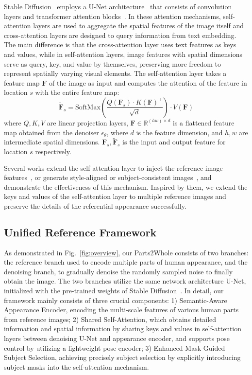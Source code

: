Stable Diffusion~\cite{rombach2022ldm} employs a U-Net architecture~\cite{ronneberger2015unet} that consists of convolution layers and transformer attention blocks~\cite{vaswani2017attention}. In these attention mechanisms, self-attention layers are used to aggregate the spatial features of the image itself and cross-attention layers are designed to query information from text embedding. The main difference is that the cross-attention layer uses text features as keys and values, while in self-attention layers, image features with spatial dimensions serve as query, key, and value by themselves, preserving more freedom to represent spatially varying visual elements. The self-attention layer takes a feature map $\bm{F}$ of the image as input and computes the attention of the feature in location $s$ with the entire feature map: 
\begin{equation}
    \tilde{\bm{F}}_{s} = \text{SoftMax}\left(
    \frac{
    Q(\bm{F}_s)\cdot K(\bm{F})^{\top}
    }{
    \sqrt{d}
    }\right)\cdot V(\bm{F})
    \label{eq:diff_self_attn}
\end{equation}
where $Q,K,V$ are linear projection layers, $\bm{F}\in \mathbb{R}^{(hw)\times d}$ is a flattened feature map obtained from the denoiser $\epsilon_{\theta}$, where $d$ is the feature dimension, and $h,w$ are intermediate spatial dimensions. $\bm{F}_s, \tilde{\bm{F}}_s$ is the input and output feature for location $s$ respectively.

Several works extend the self-attention layer to inject the reference image features~\cite{hu2023animateanyone,xu2023magicanimate}, or generate style-aligned or subject-consistent images~\cite{tewel2024consistory, hertz2023stylealigned, jeong2024visualstyleprompt}, and demonstrate the effectiveness of this mechanism. Inspired by them, we extend the keys and values of the self-attention layer to multiple reference images and preserve the details of the referential appearance successfully.

\subsection{Unified Reference Framework}
\label{subsec:unifiedref}

As demonstrated in Fig.~\ref{fig:overview}, our Parts2Whole consists of two branches:  the reference branch used to encode multiple parts of human appearance, and the denoising branch, to gradually denoise the randomly sampled noise to finally obtain the image. The two branches utilize the same network architecture U-Net, initialized with the pre-trained weights of Stable Diffusion~\cite{rombach2022ldm}. In detail, our framework mainly consists of three crucial components: 1) Semantic-Aware Appearance Encoder, encoding the multi-scale features of various human parts from reference images; 2) Shared Self-Attention, which obtains detailed information and spatial information by sharing keys and values in self-attention layers between denoising U-Net and appearance encoder, and supports pose control by utilizing a lightweight pose encoder; 3) Enhanced Mask-Guided Subject Selection, achieving precisely subject selection by explicitly introducing subject masks into the self-attention mechanism.

